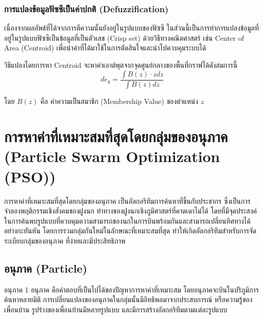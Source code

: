 \subsubsection{การแปลงข้อมูลฟัซซีเป็นค่าปกติ (Defuzzification)}
เนื่องจากผลลัพธ์ที่ได้จากการตีความนั้นยังอยู่ในรูปแบบของฟัซซี ในส่วนนี้เป็นการทำการแปลงข้อมูลที่อยู่ในรูปแบบฟัซซีเป็นข้อมูลที่เป็นตัวเลข (Crisp set) ด้วยวิธีทางคณิตศาสตร์ เช่น Center of Area (Centroid) เพื่อนำค่าที่ได้มาใช้ในการตัดสินใจและนำไปควบคุมระบบได้

วิธีแปลงโดยการหา Centroid จะหาค่าเอาต์พุตจากจุดศูนย์กลางของพื้นที่กราฟได้ดังสมการนี้
\begin{equation}
  de_y = \frac{\int B(z)\cdot zdz}{\int B(z)dz}
\end{equation}

โดย \(B(z)\) คือ ค่าความเป็นสมาชิก (Membership Value) ของตำแหน่ง \(z\)

\section{การหาค่าที่เหมาะสมที่สุดโดยกลุ่มของอนุภาค (Particle Swarm Optimization (PSO))}
การหาค่าที่เหมาะสมที่สุดโดยกลุ่มของอนุภาค เป็นอัลกอริทึมการค้นหาที่ขึ้นกับประชากร ซึ่งเป็นการจำลองพฤติกรรมเชิงสังคมของฝูงนก ท่าทางของฝูงนกเชิงภูมิศาสตร์ที่คาดเดาไม่ได้ โดยที่มีจุดประสงค์ในการค้นพบรูปแบบที่ควบคุมความสามารถของนกในการบินพร้อมกันและสามารถเปลี่ยนทิศทางได้อย่างกะทันหัน โดยการรวมกลุ่มกันใหม่ในลักษณะที่เหมาะสมที่สุด ทำให้เกิดอัลกอริทึมสำหรับการจัดระเบียบกลุ่มของอนุภาค ที่ง่ายและมีประสิทธิภาพ

\subsection{อนุภาค (Particle)}
อนุภาค 1 อนุภาค คือคำตอบที่เป็นไปได้ของปัญหาการหาค่าที่เหมาะสม โดยอนุภาคจะบินในปริภูมิการค้นหาหลายมิติ การเปลี่ยนแปลงของอนุภาคในกลุ่มนั้นมีอิทธิพลมาจากประสบการณ์ หรือความรู้ของเพื่อนบ้าน รูปร่างของเพื่อนบ้านมีหลายรูปแบบ และมีการสร้างอัลกอริทึมตามแต่ละรูปแบบ

